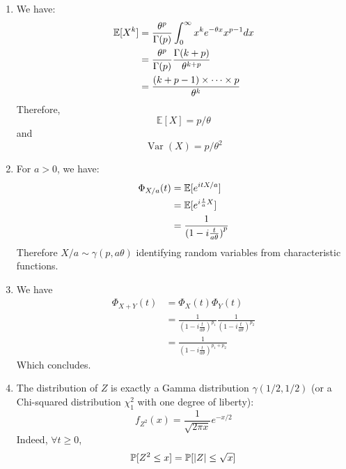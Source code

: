 
\begin{solution}
  \begin{enumerate}
    \item We have:
          \begin{align*}
            \mathbb{E}[X^k] & = \frac{\theta^p}{\Gamma(p)} \int_0^\infty x^k e^{-\theta x} x^{p-1} dx \\
                            & = \frac{\theta^p}{\Gamma(p)} \frac{\Gamma(k+p)}{\theta^{k+p}}           \\
                            & = \frac{(k+p-1) \times \cdots \times p}{\theta^k}
          \end{align*}
          Therefore,
          \[\mathbb{E}[X]=p / \theta \]
          and
          \[\operatorname{Var}(X)=p / \theta^{2}\]
    \item For $a > 0$, we have:
          \begin{align*}
            \Phi_{X/a}(t) & = \mathbb{E}[e^{itX/a}]                   \\
                          & = \mathbb{E}[e^{i\frac{t}{a}X}]           \\
                          & = \frac{1}{{(1-i \frac{t}{a\theta})}^{p}}
          \end{align*}
          Therefore $X/a \sim \gamma(p, a\theta)$ identifying random variables from characteristic functions.
    \item We have
          \begin{align*}
            \Phi_{X+Y}(t) & = \Phi_{X}(t) \Phi_{Y}(t)                                                             \\
                          & = \frac{1}{{(1-i \frac{t}{a\theta})}^{p_1}} \frac{1}{{(1-i \frac{t}{a\theta})}^{p_2}} \\
                          & = \frac{1}{{(1-i \frac{t}{a\theta})}^{p_1 + p_2}}
          \end{align*}
          Which concludes.
    \item The distribution of $Z$ is exactly a Gamma distribution $\gamma(1/2, 1/2)$ (or
          a Chi-squared distribution $\chi^2_1$ with one degree of liberty):
          \[
            f_{Z^2} (x) = \frac{1}{\sqrt{2 \pi x} }e^{-x/2}
          \]
          Indeed, $\forall t \geq 0$,
          \begin{align*}
            \proba{Z^2 \leq x} & = \proba{ |Z| \leq \sqrt{x}}                                                                                 \\

\end{align*}
\end{enumerate}
\end{solution}

